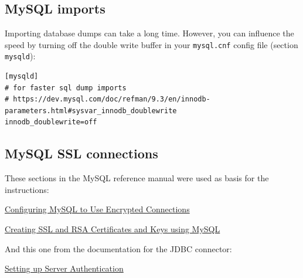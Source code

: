 \subsection{MySQL imports}
Importing database dumps can take a long time. However, you can influence the speed by
turning off the double write buffer in your \texttt{mysql.cnf} config
file (section \texttt{mysqld}):

{\scriptsize
\begin{verbatim}
[mysqld]
# for faster sql dump imports
# https://dev.mysql.com/doc/refman/9.3/en/innodb-parameters.html#sysvar_innodb_doublewrite
innodb_doublewrite=off
\end{verbatim}}



\subsection{MySQL SSL connections}
\label{mysql_ssl_connections}
These sections in the MySQL reference manual were used as basis for the instructions:
\begin{tight_itemize}
    \item \href{https://dev.mysql.com/doc/refman/8.4/en/using-encrypted-connections.html}{Configuring MySQL to Use Encrypted Connections}
    \item \href{https://dev.mysql.com/doc/refman/8.4/en/creating-ssl-rsa-files-using-mysql.html}{Creating SSL and RSA Certificates and Keys using MySQL}
\end{tight_itemize}
And this one from the documentation for the JDBC connector:
\begin{tight_itemize}
    \item \href{https://dev.mysql.com/doc/connector-j/en/connector-j-server-authentication.html}{Setting up Server Authentication}
\end{tight_itemize}

